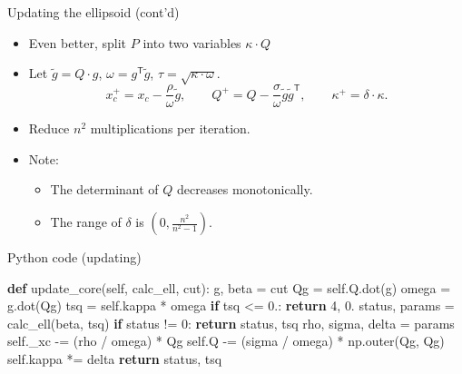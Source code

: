 \documentclass[
  ignorenonframetext,
  aspectratio=169,
  serif,onlymath]{beamer}
\newenvironment{Shaded}{}{}
\newcommand{\ControlFlowTok}[1]{\textcolor[rgb]{0.00,0.44,0.13}{\textbf{#1}}}
\newcommand{\DecValTok}[1]{\textcolor[rgb]{0.25,0.63,0.44}{#1}}
\newcommand{\FloatTok}[1]{\textcolor[rgb]{0.25,0.63,0.44}{#1}}
\newcommand{\KeywordTok}[1]{\textcolor[rgb]{0.00,0.44,0.13}{\textbf{#1}}}
\newcommand{\NormalTok}[1]{#1}
\newcommand{\OperatorTok}[1]{\textcolor[rgb]{0.40,0.40,0.40}{#1}}
\newcommand{\VariableTok}[1]{\textcolor[rgb]{0.10,0.09,0.49}{#1}}
\providecommand{\tightlist}{%
  \setlength{\itemsep}{0pt}\setlength{\parskip}{0pt}}
\begin{document}
\begin{frame}{Updating the ellipsoid (cont'd)}
\protect\hypertarget{updating-the-ellipsoid-contd}{}

\begin{itemize}
\item
  Even better, split \(P\) into two variables \(\kappa \cdot Q\)
\item
  Let \(\tilde{g} = Q \cdot g\), \(\omega = g^\mathsf{T}\tilde{g}\),
  \(\tau = \sqrt{\kappa\cdot\omega}\).
  \[x_c^+ = x_c - \frac{\rho}{\omega} \tilde{g}, \qquad
  Q^+ = Q - \frac{\sigma}{\omega} \tilde{g}\tilde{g}^\mathsf{T}, \qquad
  \kappa^+ =  \delta\cdot\kappa. \]
\item
  Reduce \(n^2\) multiplications per iteration.
\item
  Note:

  \begin{itemize}
  \tightlist
  \item
    The determinant of \(Q\) decreases monotonically.
  \item
    The range of \(\delta\) is \((0, \frac{n^2}{n^2 - 1})\).
  \end{itemize}
\end{itemize}

\end{frame}

\begin{frame}[fragile]{Python code (updating)}
\protect\hypertarget{python-code-updating}{}

\begin{Shaded}
\begin{Highlighting}[]
\KeywordTok{def}\NormalTok{ update_core(}\VariableTok{self}\NormalTok{, calc_ell, cut):}
\NormalTok{    g, beta }\OperatorTok{=}\NormalTok{ cut}
\NormalTok{    Qg }\OperatorTok{=} \VariableTok{self}\NormalTok{.Q.dot(g)}
\NormalTok{    omega }\OperatorTok{=}\NormalTok{ g.dot(Qg)}
\NormalTok{    tsq }\OperatorTok{=} \VariableTok{self}\NormalTok{.kappa }\OperatorTok{*}\NormalTok{ omega}
    \ControlFlowTok{if}\NormalTok{ tsq }\OperatorTok{<=} \FloatTok{0.}\NormalTok{:}
        \ControlFlowTok{return} \DecValTok{4}\NormalTok{, }\FloatTok{0.}
\NormalTok{    status, params }\OperatorTok{=}\NormalTok{ calc_ell(beta, tsq)}
    \ControlFlowTok{if}\NormalTok{ status }\OperatorTok{!=} \DecValTok{0}\NormalTok{:}
        \ControlFlowTok{return}\NormalTok{ status, tsq}
\NormalTok{    rho, sigma, delta }\OperatorTok{=}\NormalTok{ params}
    \VariableTok{self}\NormalTok{._xc }\OperatorTok{-=}\NormalTok{ (rho }\OperatorTok{/}\NormalTok{ omega) }\OperatorTok{*}\NormalTok{ Qg}
    \VariableTok{self}\NormalTok{.Q }\OperatorTok{-=}\NormalTok{ (sigma }\OperatorTok{/}\NormalTok{ omega) }\OperatorTok{*}\NormalTok{ np.outer(Qg, Qg)}
    \VariableTok{self}\NormalTok{.kappa }\OperatorTok{*=}\NormalTok{ delta}
    \ControlFlowTok{return}\NormalTok{ status, tsq}
\end{Highlighting}
\end{Shaded}

\end{frame}
\end{document}
